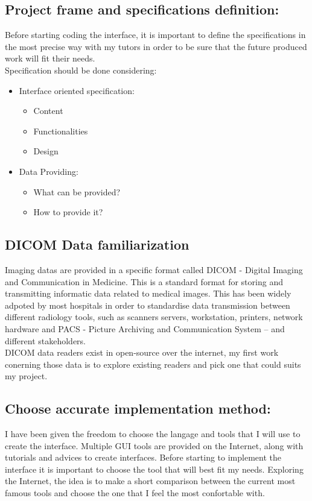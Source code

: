\documentclass[12pt,twoside]{article}
\begin{document}
\subsection{Project frame and specifications definition:}
Before starting coding the interface, it is important to define the specifications in the most precise way with my tutors in order to be sure that the future produced work will fit their needs. \\
Specification should be done considering:
\begin{itemize}
\item Interface oriented specification:
\begin{itemize}
\item Content
\item Functionalities
\item Design
\end{itemize}

\item Data Providing:
\begin{itemize} 
\item What can be provided?
\item How to provide it?
\end{itemize}

	
\end{itemize}

\clearpage

\subsection{DICOM Data familiarization}
Imaging datas are provided in a specific format called DICOM - Digital Imaging and Communication in Medicine. This is a standard format for storing and transmitting informatic data related to medical images. This has been widely adpoted by most hospitals in order to standardise data transmission between different radiology tools, such as scanners servers, workstation, printers, network hardware and PACS - Picture Archiving and Communication System – and different stakeholders.  \\
DICOM data readers exist in open-source over the internet, my first work conerning those data is to explore existing readers and pick one that could suits my project.


 

\subsection{Choose accurate implementation method:}
I have been given the freedom to choose the langage and tools that I will use to create the interface. Multiple GUI tools are provided on the Internet, along with tutorials and advices to create interfaces. Before starting to implement the interface it is important to choose the tool that will best fit my needs. Exploring the Internet, the idea is to make a short comparison between the current most famous tools and choose the one that I feel the most confortable with.
\end{document}
